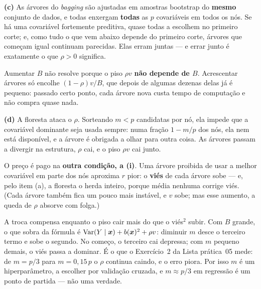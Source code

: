 \begin{solucao}
\smallskip
\textbf{(c)} As árvores do \emph{bagging} são ajustadas em amostras bootstrap do
\textbf{mesmo} conjunto de dados, e todas enxergam \textbf{todas} as $p$ covariáveis em
todos os nós. Se há uma covariável fortemente preditiva, quase todas a escolhem no
primeiro corte; e, como tudo o que vem abaixo depende do primeiro corte, árvores que
começam igual continuam parecidas. Elas erram juntas --- e errar junto é exatamente o
que $\rho>0$ significa.

Aumentar $B$ não resolve porque o piso $\rho v$ \textbf{não depende de $B$}. Acrescentar
árvores só encolhe $(1-\rho)v/B$, que depois de algumas dezenas delas já é pequeno:
passado certo ponto, cada árvore nova custa tempo de computação e não compra quase nada.

\smallskip
\textbf{(d)} A floresta ataca o $\rho$. Sorteando $m<p$ candidatas por nó, ela impede
que a covariável dominante seja usada sempre: numa fração $1-m/p$ dos nós, ela nem está
disponível, e a árvore é obrigada a olhar para outra coisa. As árvores passam a divergir
na estrutura, $\rho$ cai, e o piso $\rho v$ cai junto.

O preço é pago na \textbf{outra condição, a (i)}. Uma árvore proibida de usar a melhor
covariável em parte dos nós aproxima $r$ pior: o \textbf{viés} de cada árvore sobe --- e,
pelo item (a), a floresta o herda inteiro, porque média nenhuma corrige viés. (Cada
árvore também fica um pouco mais instável, e $v$ sobe; mas esse aumento, a queda de
$\rho$ absorve com folga.)

A troca compensa enquanto o piso cair mais do que o viés$^2$ subir. Com $B$ grande, o
que sobra da fórmula é $\operatorname{Var}(Y\mid\bm{x})+b(\bm{x})^2+\rho v$: diminuir $m$ desce o terceiro
termo e sobe o segundo. No começo, o terceiro cai depressa; com $m$ pequeno demais, o
viés passa a dominar. É o que o Exercício~2 da Lista prática~05 mede: de $m=p/3$ para
$m=0{,}15\,p$ o $\rho$ continua caindo, e o erro piora. Por isso $m$ é um hiperparâmetro,
a escolher por validação cruzada, e $m\approx p/3$ em regressão é um ponto de partida
--- não uma verdade.
\end{solucao}
